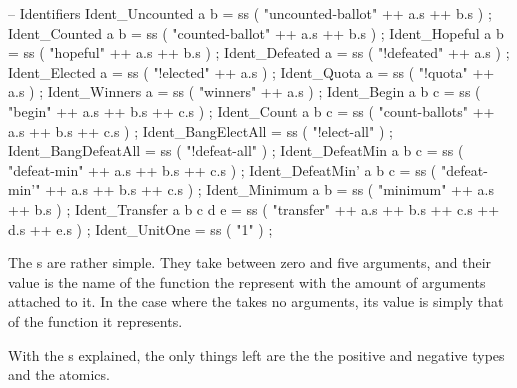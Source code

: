 \begin{lstgf}
        -- Identifiers
        Ident_Uncounted a b             = ss ( "uncounted-ballot" ++ a.s ++ b.s ) ;
        Ident_Counted a b               = ss ( "counted-ballot" ++ a.s ++ b.s ) ;
        Ident_Hopeful a b               = ss ( "hopeful" ++ a.s ++ b.s ) ;
        Ident_Defeated a                = ss ( "!defeated" ++ a.s ) ;
        Ident_Elected a                 = ss ( "!elected" ++ a.s ) ;
        Ident_Quota a                   = ss ( "!quota" ++ a.s ) ;
        Ident_Winners a                 = ss ( "winners" ++ a.s ) ;
        Ident_Begin a b c               = ss ( "begin" ++ a.s ++ b.s ++ c.s ) ;
        Ident_Count a b c               = ss ( "count-ballots" ++ a.s ++ b.s ++ c.s ) ;
        Ident_BangElectAll              = ss ( "!elect-all" ) ;
        Ident_BangDefeatAll             = ss ( "!defeat-all" ) ;
        Ident_DefeatMin a b c           = ss ( "defeat-min" ++ a.s ++ b.s ++ c.s ) ;
        Ident_DefeatMin' a b c          = ss ( "defeat-min'" ++ a.s ++ b.s ++ c.s ) ;
        Ident_Minimum a b               = ss ( "minimum" ++ a.s ++ b.s ) ;
        Ident_Transfer a b c d e        = ss ( "transfer" ++ a.s ++ b.s ++ c.s ++ d.s ++ e.s ) ;
        Ident_UnitOne                   = ss ( "1" ) ;
\end{lstgf}

The s are rather simple. They take between zero and five arguments, and their value is the name of the function the represent with the amount of arguments attached to it. In the case where the  takes no arguments, its value is simply that of the function it represents.

With the s explained, the only things left are the the positive and negative types and the atomics.

